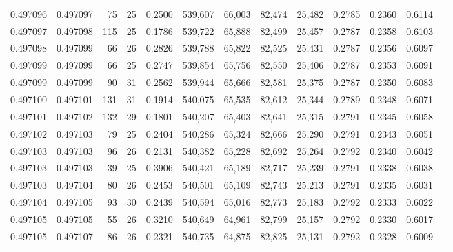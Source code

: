 \begin{tabular}{rrrrrrrrrrrrr}
0.497096 & 0.497097 &  75 &  25 &                                     0.2500 & 539,607 &  66,003 &  82,474 &  25,482 & 0.2785 & 0.2360 & 0.6114 \\
0.497097 & 0.497098 & 115 &  25 &                                     0.1786 & 539,722 &  65,888 &  82,499 &  25,457 & 0.2787 & 0.2358 & 0.6103 \\
0.497098 & 0.497099 &  66 &  26 &                                     0.2826 & 539,788 &  65,822 &  82,525 &  25,431 & 0.2787 & 0.2356 & 0.6097 \\
0.497099 & 0.497099 &  66 &  25 &                                     0.2747 & 539,854 &  65,756 &  82,550 &  25,406 & 0.2787 & 0.2353 & 0.6091 \\
0.497099 & 0.497099 &  90 &  31 &                                     0.2562 & 539,944 &  65,666 &  82,581 &  25,375 & 0.2787 & 0.2350 & 0.6083 \\
0.497100 & 0.497101 & 131 &  31 &                                     0.1914 & 540,075 &  65,535 &  82,612 &  25,344 & 0.2789 & 0.2348 & 0.6071 \\
0.497101 & 0.497102 & 132 &  29 &                                     0.1801 & 540,207 &  65,403 &  82,641 &  25,315 & 0.2791 & 0.2345 & 0.6058 \\
0.497102 & 0.497103 &  79 &  25 &                                     0.2404 & 540,286 &  65,324 &  82,666 &  25,290 & 0.2791 & 0.2343 & 0.6051 \\
0.497103 & 0.497103 &  96 &  26 &                                     0.2131 & 540,382 &  65,228 &  82,692 &  25,264 & 0.2792 & 0.2340 & 0.6042 \\
0.497103 & 0.497103 &  39 &  25 &                                     0.3906 & 540,421 &  65,189 &  82,717 &  25,239 & 0.2791 & 0.2338 & 0.6038 \\
0.497103 & 0.497104 &  80 &  26 &                                     0.2453 & 540,501 &  65,109 &  82,743 &  25,213 & 0.2791 & 0.2335 & 0.6031 \\
0.497104 & 0.497105 &  93 &  30 &                                     0.2439 & 540,594 &  65,016 &  82,773 &  25,183 & 0.2792 & 0.2333 & 0.6022 \\
0.497105 & 0.497105 &  55 &  26 &                                     0.3210 & 540,649 &  64,961 &  82,799 &  25,157 & 0.2792 & 0.2330 & 0.6017 \\
0.497105 & 0.497107 &  86 &  26 &                                     0.2321 & 540,735 &  64,875 &  82,825 &  25,131 & 0.2792 & 0.2328 & 0.6009 \\

\end{tabular}
